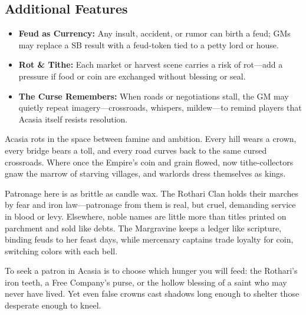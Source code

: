 \subsection*{Additional Features}
\begin{itemize}
\item \textbf{Feud as Currency:} Any insult, accident, or rumor can birth a feud; GMs may replace a SB result with a feud-token tied to a petty lord or house.
\item \textbf{Rot \& Tithe:} Each market or harvest scene carries a risk of rot---add a pressure if food or coin are exchanged without blessing or seal.
\item \textbf{The Curse Remembers:} When roads or negotiations stall, the GM may quietly repeat imagery---crossroads, whispers, mildew---to remind players that Acasia itself resists resolution.
\end{itemize}

\begin{tcolorbox}[colback=black!3,colframe=black!40!white,title={Decline \& Patronage}]
Acasia rots in the space between famine and ambition. Every hill wears a crown, every bridge bears a toll, and every road curves back to the same cursed crossroads. Where once the Empire’s coin and grain flowed, now tithe-collectors gnaw the marrow of starving villages, and warlords dress themselves as kings.

Patronage here is as brittle as candle wax. The Rothari Clan holds their marches by fear and iron law---patronage from them is real, but cruel, demanding service in blood or levy. Elsewhere, noble names are little more than titles printed on parchment and sold like debts. The Margravine keeps a ledger like scripture, binding feuds to her feast days, while mercenary captains trade loyalty for coin, switching colors with each bell.

To seek a patron in Acasia is to choose which hunger you will feed: the Rothari’s iron teeth, a Free Company’s purse, or the hollow blessing of a saint who may never have lived. Yet even false crowns cast shadows long enough to shelter those desperate enough to kneel.
\end{tcolorbox}

